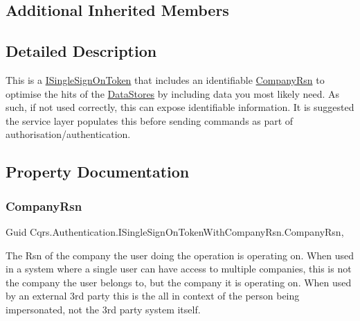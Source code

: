 \subsection*{Additional Inherited Members}


\subsection{Detailed Description}
This is a \hyperlink{interfaceCqrs_1_1Authentication_1_1ISingleSignOnToken}{I\+Single\+Sign\+On\+Token} that includes an identifiable \hyperlink{interfaceCqrs_1_1Authentication_1_1ISingleSignOnTokenWithCompanyRsn_a26ffa6ca2e583f0ecc440b68fe3edd52_a26ffa6ca2e583f0ecc440b68fe3edd52}{Company\+Rsn} to optimise the hits of the \hyperlink{}{Data\+Stores} by including data you most likely need. As such, if not used correctly, this can expose identifiable information. It is suggested the service layer populates this before sending commands as part of authorisation/authentication. 



\subsection{Property Documentation}
\mbox{\label{interfaceCqrs_1_1Authentication_1_1ISingleSignOnTokenWithCompanyRsn_a26ffa6ca2e583f0ecc440b68fe3edd52_a26ffa6ca2e583f0ecc440b68fe3edd52}} 
\subsubsection{\texorpdfstring{Company\+Rsn}{CompanyRsn}}
{\footnotesize\ttfamily Guid Cqrs.\+Authentication.\+I\+Single\+Sign\+On\+Token\+With\+Company\+Rsn.\+Company\+Rsn\hspace{0.3cm}{\ttfamily [get]}, {\ttfamily [set]}}



The Rsn of the company the user doing the operation is operating on. When used in a system where a single user can have access to multiple companies, this is not the company the user belongs to, but the company it is operating on. When used by an external 3rd party this is the all in context of the person being impersonated, not the 3rd party system itself. 

